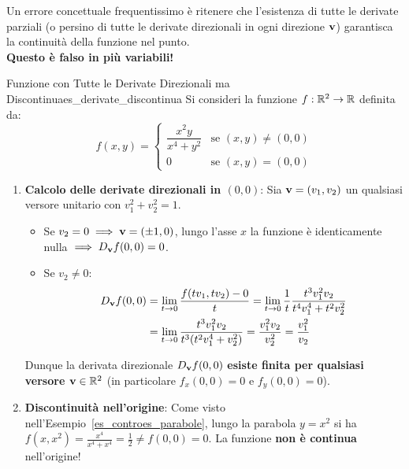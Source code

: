 \begin{esame}
Un errore concettuale frequentissimo è ritenere che l'esistenza di tutte le derivate parziali (o persino di tutte le derivate direzionali in ogni direzione $\mathbf{v}$) garantisca la continuità della funzione nel punto.\\
\textbf{Questo è falso in più variabili!}
\end{esame}

\begin{esempio}{Funzione con Tutte le Derivate Direzionali ma Discontinua}{es_derivate_discontinua}
Si consideri la funzione $f: \mathbb{R}^2 \to \mathbb{R}$ definita da:
\[
f(x,y) = \begin{cases} \dfrac{x^2 y}{x^4 + y^2} & \text{se } (x,y) \neq (0,0) \\ 0 & \text{se } (x,y) = (0,0) \end{cases}
\]
\begin{enumerate}
    \item \textbf{Calcolo delle derivate direzionali in $(0,0)$}:
    Sia $\mathbf{v} = (v_1, v_2)$ un qualsiasi versore unitario con $v_1^2 + v_2^2 = 1$.
    \begin{itemize}
        \item Se $v_2 = 0 \implies \mathbf{v} = (\pm 1, 0)$, lungo l'asse $x$ la funzione è identicamente nulla $\implies D_{\mathbf{v}} f(0,0) = 0$.
        \item Se $v_2 \neq 0$:
        \begin{align*}
        D_{\mathbf{v}} f(0,0) &= \lim_{t \to 0} \frac{f(t v_1, t v_2) - 0}{t} = \lim_{t \to 0} \frac{1}{t} \frac{t^3 v_1^2 v_2}{t^4 v_1^4 + t^2 v_2^2} \\
        &= \lim_{t \to 0} \frac{t^3 v_1^2 v_2}{t^3 (t^2 v_1^4 + v_2^2)} = \frac{v_1^2 v_2}{v_2^2} = \frac{v_1^2}{v_2}
        \end{align*}
    \end{itemize}
    Dunque la derivata direzionale $D_{\mathbf{v}} f(0,0)$ \textbf{esiste finita per qualsiasi versore $\mathbf{v} \in \mathbb{R}^2$} (in particolare $f_x(0,0) = 0$ e $f_y(0,0) = 0$).
    \item \textbf{Discontinuità nell'origine}:
    Come visto nell'Esempio~\ref{es_controes_parabole}, lungo la parabola $y = x^2$ si ha $f(x, x^2) = \frac{x^4}{x^4 + x^4} = \frac{1}{2} \neq f(0,0) = 0$.
    La funzione \textbf{non è continua} nell'origine!
\end{enumerate}
\end{esempio}

